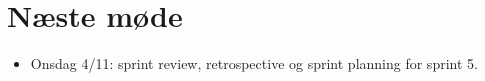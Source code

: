 \documentclass[a4paper,11pt]{article}
\begin{document}
\section*{Næste møde}

\begin{itemize}
    \item Onsdag 4/11: sprint review, retrospective og sprint planning for sprint 5.
\end{itemize}
\end{document}
